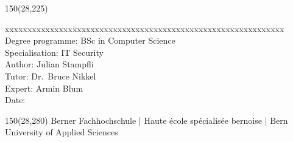 \begin{titlepage}
\begin{flushleft}
\begin{textblock}{150}(28,225)
\fontsize{10pt}{17pt}\selectfont
\begin{tabbing}
xxxxxxxxxxxxxxx\=xxxxxxxxxxxxxxxxxxxxxxxxxxxxxxxxxxxxxxxxxxxxxxx \kill
Degree programme:	\> BSc in Computer Science	\\		%
Specialisation:	\> IT Security	\\		%
Author:		\> 		Julian Stampfli\\					%
Tutor:	\> Dr.~Bruce Nikkel		\\							%
Expert:		\> Armin Blum				\\							%
Date:			\> \versiondate					\\							%
\end{tabbing}

\end{textblock}
\end{flushleft}

\begin{textblock}{150}(28,280)
\noindent 
\color{bfhgrey}\fontsize{9pt}{10pt}\selectfont
Berner Fachhochschule | Haute \'ecole sp\'ecialis\'ee bernoise | Bern University of Applied Sciences
\color{black}\selectfont
\end{textblock}


\end{titlepage}

%
%
